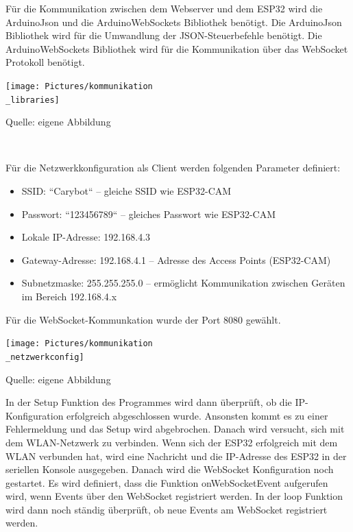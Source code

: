 \documentclass[ngerman,12pt,a4paper]{article}
\begin{document}
	Für die Kommunikation zwischen dem Webserver und dem ESP32 wird die ArduinoJson und die ArduinoWebSockets Bibliothek benötigt. Die ArduinoJson Bibliothek wird für die Umwandlung der JSON-Steuerbefehle benötigt. Die ArduinoWebSockets Bibliothek wird für die Kommunikation über das WebSocket Protokoll benötigt. 
	\begin{center}
		\begin{minipage}[t]{0.45\textwidth}
			\texttt{[image: Pictures/kommunikation\\\_libraries]}
			\label{fig:kommunikation_libraries}
			\vspace{-10pt}
			\begin{center}
				\par\small Quelle: eigene Abbildung 
			\end{center}
		\end{minipage} \\[0.75cm]
	\end{center}
	Für die Netzwerkkonfiguration als Client werden folgenden Parameter definiert:
	\begin{itemize}
		\item SSID: “Carybot“ – gleiche SSID wie ESP32-CAM
		\item Passwort: “123456789“ – gleiches Passwort wie ESP32-CAM
		\item Lokale IP-Adresse: 192.168.4.3 
		\item Gateway-Adresse: 192.168.4.1 – Adresse des Access Points (ESP32-CAM)
		\item Subnetzmaske: 255.255.255.0 – ermöglicht Kommunikation zwischen Geräten im Bereich 192.168.4.x
	\end{itemize}
	Für die WebSocket-Kommunkation wurde der Port 8080 gewählt. 
	\begin{center}
		\begin{minipage}[t]{0.65\textwidth}
			\texttt{[image: Pictures/kommunikation\\\_netzwerkconfig]}
			\label{fig:kommunikation_netwerkconfig}
			\vspace{-10pt}
			\begin{center}
				\par\small Quelle: eigene Abbildung 
			\end{center}
		\end{minipage} 
	\end{center}
	In der Setup Funktion des Programmes wird dann überprüft, ob die IP-Konfiguration erfolgreich abgeschlossen wurde. Ansonsten kommt es zu einer Fehlermeldung und das Setup wird abgebrochen. Danach wird versucht, sich mit dem WLAN-Netzwerk zu verbinden. Wenn sich der ESP32 erfolgreich mit dem WLAN verbunden hat, wird eine Nachricht und die IP-Adresse des ESP32 in der seriellen Konsole ausgegeben. Danach wird die WebSocket Konfiguration noch gestartet. Es wird definiert, dass die Funktion onWebSocketEvent aufgerufen wird, wenn Events über den WebSocket registriert werden. In der loop Funktion wird dann noch ständig überprüft, ob neue Events am WebSocket registriert werden.
\end{document}
